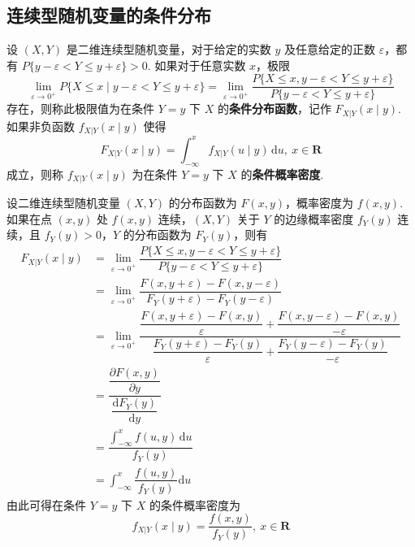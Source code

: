 \subsection{连续型随机变量的条件分布}

\begin{definition}
    设 $(X,Y)$ 是二维连续型随机变量，对于给定的实数 $y$ 及任意给定的正数 $\varepsilon$，都有 $P\{y-\varepsilon < Y \leqslant y+\varepsilon\} > 0$. 如果对于任意实数 $x$，极限
    $$
    \lim_{\varepsilon \to 0^+} P\{X \leqslant x \mid y-\varepsilon < Y \leqslant y+\varepsilon\} = \lim_{\varepsilon \to 0^+} \dfrac{P\{X \leqslant x, y-\varepsilon < Y \leqslant y+\varepsilon\}}{P\{y-\varepsilon < Y \leqslant y+\varepsilon\}}
    $$
    存在，则称此极限值为在条件 $Y=y$ 下 $X$ 的\textbf{条件分布函数}，记作 $F_{X|Y}(x \mid y)$. 如果非负函数 $f_{X|Y}(x \mid y)$ 使得
    $$
    F_{X|Y}(x \mid y) = \int_{-\infty}^x f_{X|Y}(u \mid y) \, \text{d}u,\ x \in \mathbf{R}
    $$
    成立，则称 $f_{X|Y}(x \mid y)$ 为在条件 $Y=y$ 下 $X$ 的\textbf{条件概率密度}.
\end{definition}

设二维连续型随机变量 $(X,Y)$ 的分布函数为 $F(x,y)$，概率密度为 $f(x,y)$. 如果在点 $(x,y)$ 处 $f(x,y)$ 连续，$(X,Y)$ 关于 $Y$ 的边缘概率密度 $f_{Y}(y)$ 连续，且 $f_{Y}(y)>0$，$Y$ 的分布函数为 $F_{Y}(y)$，则有
$$
\begin{aligned}
    F_{X|Y}(x \mid y) &= \lim_{\varepsilon \to 0^+} \dfrac{P\{X \leqslant x, y-\varepsilon < Y \leqslant y+\varepsilon\}}{P\{y-\varepsilon < Y \leqslant y+\varepsilon\}} \\[0.7em]
    &= \lim_{\varepsilon \to 0^+} \dfrac{F(x, y+\varepsilon) - F(x, y-\varepsilon)}{F_{Y}(y+\varepsilon) - F_{Y}(y-\varepsilon)} \\[0.7em]
    &= \lim_{\varepsilon \to 0^+} \dfrac{\dfrac{F(x, y+\varepsilon) - F(x,y)}{\varepsilon} + \dfrac{F(x, y-\varepsilon) - F(x,y)}{-\varepsilon}}{\dfrac{F_{Y}(y+\varepsilon) - F_{Y}(y)}{\varepsilon} + \dfrac{F_{Y}(y-\varepsilon) - F_{Y}(y)}{-\varepsilon}} \\
    &= \dfrac{\dfrac{\partial F(x,y)}{\partial y}}{\dfrac{\text{d} F_{Y}(y)}{\text{d}y}} \\[1em]
    &= \dfrac{\displaystyle\int_{-\infty}^x f(u,y) \, \text{d}u}{f_{Y}(y)} \\[1em]
    &= \int_{-\infty}^x \dfrac{f(u,y)}{f_{Y}(y)} \text{d}u
\end{aligned}
$$
由此可得在条件 $Y=y$ 下 $X$ 的条件概率密度为
$$
f_{X|Y}(x \mid y) = \dfrac{f(x,y)}{f_{Y}(y)},\ x \in \mathbf{R}
$$

